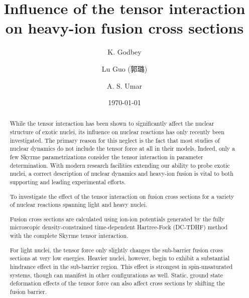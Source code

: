 \documentclass[aps,prc,twocolumn,showpacs,superscriptaddress,longbibliography,floatfix,10pt]{revtex4-1}
\begin{document}
\title{Influence of the tensor interaction on heavy-ion fusion cross sections}
\begin{CJK*}{UTF8}{gbsn}
\author{K. Godbey} 
\author{Lu Guo (郭璐)} 
\author{A. S. Umar} 

\date{\today}

\begin{abstract}
\edef\oldrightskip{\the\rightskip}
\begin{description}
        \rightskip\oldrightskip\relax
        \setlength{\parskip}{0pt}
\item[Background]

While the tensor interaction has been shown to significantly affect the nuclear structure of exotic nuclei, its influence on nuclear reactions has only recently been investigated.
The primary reason for this neglect is the fact that most studies of nuclear dynamics do not include the tensor force at all in their models.
Indeed, only a few Skyrme parametrizations consider the tensor interaction in parameter determination.
With modern research facilities extending our ability to probe exotic nuclei, a correct description of nuclear dynamics and heavy-ion fusion is vital to both supporting and leading experimental efforts.

\item[Purpose]
To investigate the effect of the tensor interaction on fusion cross sections for a variety of nuclear reactions spanning light and heavy nuclei.

\item[Method]
Fusion cross sections are calculated using ion-ion potentials generated by the fully microscopic density-constrained time-dependent Hartree-Fock (DC-TDHF) method with the complete Skyrme tensor interaction.

\item[Results]
For light nuclei, the tensor force only slightly changes the sub-barrier fusion cross sections at very low energies.
Heavier nuclei, however, begin to exhibit a substantial hindrance effect in the sub-barrier region.
This effect is strongest in spin-unsaturated systems, though can manifest in other configurations as well.
Static, ground state deformation effects of the tensor force can also affect cross sections by shifting the fusion barrier.


\end{description}
\end{abstract}
\end{CJK*}
\end{document}

